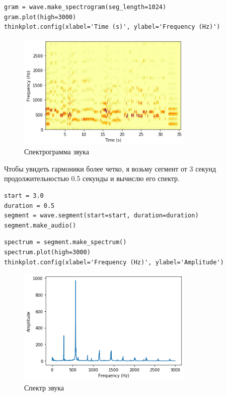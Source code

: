 \documentclass[a4paper,12pt]{report}
\begin{document}
\begin{lstlisting}[caption=Спектрограмма звука]
gram = wave.make_spectrogram(seg_length=1024)
gram.plot(high=3000)
thinkplot.config(xlabel='Time (s)', ylabel='Frequency (Hz)')
\end{lstlisting}

\begin{figure}[H]
        \centering
        \includegraphics[width=0.75\textwidth]{lab5_fig4_1.png}
        \caption{Спектрограмма звука}
        \label{fig:lab5_fig4_1}
\end{figure}

Чтобы увидеть гармоники более четко, я возьму сегмент от 3 секунд продолжительностью 0.5 секунды и вычислю его спектр.

\begin{lstlisting}[caption=Создание сегмента звука]
start = 3.0
duration = 0.5
segment = wave.segment(start=start, duration=duration)
segment.make_audio()
\end{lstlisting}

\begin{lstlisting}[caption=Спектр звука]
spectrum = segment.make_spectrum()
spectrum.plot(high=3000)
thinkplot.config(xlabel='Frequency (Hz)', ylabel='Amplitude')
\end{lstlisting}

\begin{figure}[H]
        \centering
        \includegraphics[width=0.75\textwidth]{lab5_fig4_2.png}
        \caption{Спектр звука}
        \label{fig:lab5_fig4_2}
\end{figure}
\end{document}

